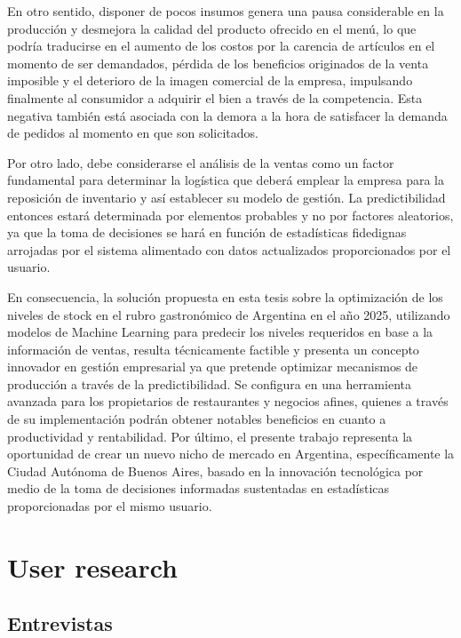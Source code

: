 En otro sentido, disponer de pocos insumos genera una pausa considerable en la producción y  desmejora la calidad del producto ofrecido en el menú, lo que podría traducirse en el aumento de los costos por la carencia de artículos en el momento de ser demandados, pérdida de los beneficios originados de la venta imposible y el deterioro de la imagen comercial de la empresa, impulsando finalmente al consumidor a adquirir el bien a través de la competencia. Esta negativa también está asociada con la demora a la hora de satisfacer la demanda de pedidos al  momento en que son solicitados. 

Por otro lado, debe considerarse el análisis de la ventas como un factor fundamental para determinar la logística que deberá emplear la empresa para la reposición de inventario y así establecer su modelo de gestión. La predictibilidad entonces estará determinada por elementos probables y no por factores aleatorios, ya que la toma de decisiones se hará en función de estadísticas fidedignas arrojadas por el sistema alimentado con datos actualizados proporcionados por el usuario.

En consecuencia, la solución propuesta en esta tesis sobre la optimización de los niveles de stock en el rubro gastronómico de Argentina en el año 2025, utilizando modelos de Machine Learning para predecir los niveles requeridos en base a la información de ventas, resulta técnicamente factible y presenta un concepto innovador en gestión empresarial ya que pretende optimizar mecanismos de producción a través de la predictibilidad. Se configura en una herramienta avanzada para los propietarios de restaurantes y negocios afines, quienes a través de su implementación podrán obtener notables beneficios en cuanto a productividad y rentabilidad. Por último, el presente trabajo representa la oportunidad de crear un nuevo nicho de mercado en Argentina, específicamente la Ciudad Autónoma de Buenos Aires, basado en la innovación tecnológica por medio de la toma de decisiones informadas sustentadas en estadísticas proporcionadas por el mismo usuario.  


\section{User research}\label{sec:user-research}

\subsection{Entrevistas}\label{sec:entrevistas}

